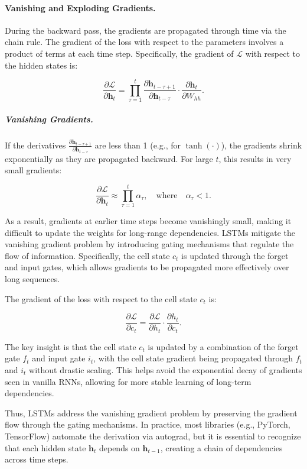 \documentclass[11pt]{article}
\begin{document}
\paragraph{Vanishing and Exploding Gradients.}

During the backward pass, the gradients are propagated through time via the chain rule. The gradient of the loss with respect to the parameters involves a product of terms at each time step. Specifically, the gradient of \(\mathcal{L}\) with respect to the hidden states is:

\[
\frac{\partial \mathcal{L}}{\partial \mathbf{h}_t} = \prod_{\tau=1}^t \frac{\partial \mathbf{h}_{t-\tau+1}}{\partial \mathbf{h}_{t-\tau}} \cdot \frac{\partial \mathbf{h}_t}{\partial W_{hh}}.
\]

\subparagraph{Vanishing Gradients.}
If the derivatives \(\frac{\partial \mathbf{h}_{t-\tau+1}}{\partial \mathbf{h}_{t-\tau}}\) are less than 1 (e.g., for \(\tanh(\cdot)\)), the gradients shrink exponentially as they are propagated backward. For large \(t\), this results in very small gradients:

\[
\frac{\partial \mathcal{L}}{\partial \mathbf{h}_t} \approx \prod_{\tau=1}^t \alpha_\tau, \quad \text{where} \quad \alpha_\tau < 1.
\]

As a result, gradients at earlier time steps become vanishingly small, making it difficult to update the weights for long-range dependencies. LSTMs mitigate the vanishing gradient problem by introducing gating mechanisms that regulate the flow of information. Specifically, the cell state \( c_t \) is updated through the forget and input gates, which allows gradients to be propagated more effectively over long sequences.

The gradient of the loss with respect to the cell state \( c_t \) is:

\[
\frac{\partial \mathcal{L}}{\partial c_t} = \frac{\partial \mathcal{L}}{\partial h_t} \cdot \frac{\partial h_t}{\partial c_t}.
\]

The key insight is that the cell state \( c_t \) is updated by a combination of the forget gate \( f_t \) and input gate \( i_t \), with the cell state gradient being propagated through \( f_t \) and \( i_t \) without drastic scaling. This helps avoid the exponential decay of gradients seen in vanilla RNNs, allowing for more stable learning of long-term dependencies.

Thus, LSTMs address the vanishing gradient problem by preserving the gradient flow through the gating mechanisms. In practice, most libraries (e.g., PyTorch, TensorFlow) automate the derivation via autograd, but it is essential to recognize that each hidden state \(\mathbf{h}_t\) depends on \(\mathbf{h}_{t-1}\), creating a chain of dependencies across time steps.
\end{document}
